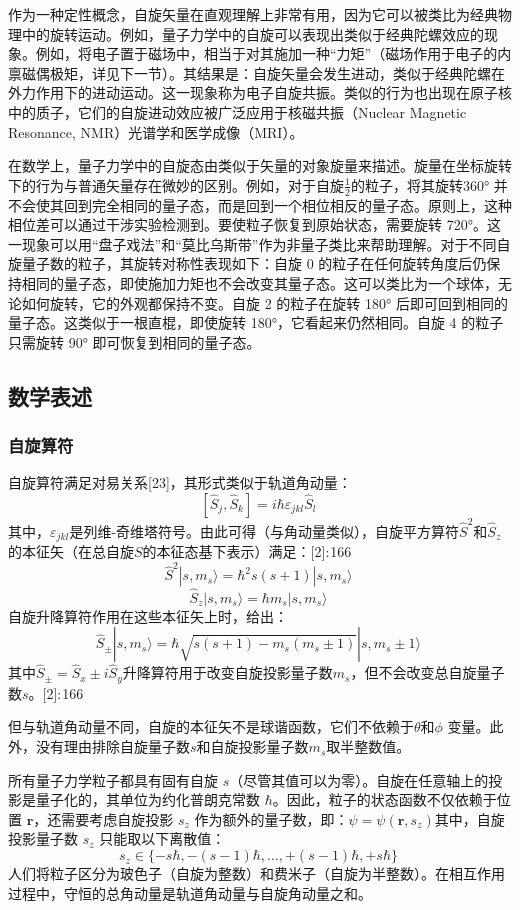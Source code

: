 作为一种定性概念，自旋矢量在直观理解上非常有用，因为它可以被类比为经典物理中的旋转运动。例如，量子力学中的自旋可以表现出类似于经典陀螺效应的现象。例如，将电子置于磁场中，相当于对其施加一种“力矩”（磁场作用于电子的内禀磁偶极矩，详见下一节）。其结果是：自旋矢量会发生进动，类似于经典陀螺在外力作用下的进动运动。这一现象称为电子自旋共振。类似的行为也出现在原子核中的质子，它们的自旋进动效应被广泛应用于核磁共振（Nuclear Magnetic Resonance, NMR）光谱学和医学成像（MRI）。

在数学上，量子力学中的自旋态由类似于矢量的对象旋量来描述。旋量在坐标旋转下的行为与普通矢量存在微妙的区别。例如，对于自旋\(\frac{1}{2}\)的粒子，将其旋转360° 并不会使其回到完全相同的量子态，而是回到一个相位相反的量子态。原则上，这种相位差可以通过干涉实验检测到。要使粒子恢复到原始状态，需要旋转 720°。这一现象可以用“盘子戏法”和“莫比乌斯带”作为非量子类比来帮助理解。对于不同自旋量子数的粒子，其旋转对称性表现如下：自旋 0 的粒子在任何旋转角度后仍保持相同的量子态，即使施加力矩也不会改变其量子态。这可以类比为一个球体，无论如何旋转，它的外观都保持不变。自旋 2 的粒子在旋转 180° 后即可回到相同的量子态。这类似于一根直棍，即使旋转 180°，它看起来仍然相同。自旋 4 的粒子只需旋转 90° 即可恢复到相同的量子态。
\subsection{数学表述} 
\subsubsection{自旋算符}  
自旋算符满足对易关系[23]，其形式类似于轨道角动量：  
\[
[\hat{S}_j, \hat{S}_k] = i \hbar \varepsilon_{jkl} \hat{S}_l~
\]  
其中，\( \varepsilon_{jkl} \)是列维-奇维塔符号。由此可得（与角动量类似），自旋平方算符\( \hat{S}^2 \)和\( \hat{S}_z \)的本征矢（在总自旋\( S \)的本征态基下表示）满足：[2]: 166  
\[
\hat{S}^2 |s, m_s \rangle = \hbar^2 s(s+1) |s, m_s \rangle~
\]
\[
\hat{S}_z |s, m_s \rangle = \hbar m_s |s, m_s \rangle~
\]
自旋升降算符作用在这些本征矢上时，给出：  
\[
\hat{S}_{\pm} |s, m_s \rangle = \hbar \sqrt{s(s+1) - m_s(m_s \pm 1)} |s, m_s \pm 1 \rangle~
\]
其中\(\hat{S}_{\pm} = \hat{S}_x \pm i \hat{S}_y\)升降算符用于改变自旋投影量子数\( m_s \)，但不会改变总自旋量子数\( s \)。[2]: 166

但与轨道角动量不同，自旋的本征矢不是球谐函数，它们不依赖于\( \theta \)和\( \phi \) 变量。此外，没有理由排除自旋量子数\( s \)和自旋投影量子数\( m_s \)取半整数值。

所有量子力学粒子都具有固有自旋 \( s \)（尽管其值可以为零）。自旋在任意轴上的投影是量子化的，其单位为约化普朗克常数 \( \hbar \)。因此，粒子的状态函数不仅依赖于位置 \( \mathbf{r} \)，还需要考虑自旋投影 \( s_z \) 作为额外的量子数，即：\(\psi = \psi (\mathbf{r}, s_z)\)其中，自旋投影量子数 \( s_z \) 只能取以下离散值：  
\[
s_z \in \{-s\hbar , -(s-1)\hbar , \dots , +(s-1)\hbar , +s\hbar \}~
\]
人们将粒子区分为玻色子（自旋为整数）和费米子（自旋为半整数）。在相互作用过程中，守恒的总角动量是轨道角动量与自旋角动量之和。
